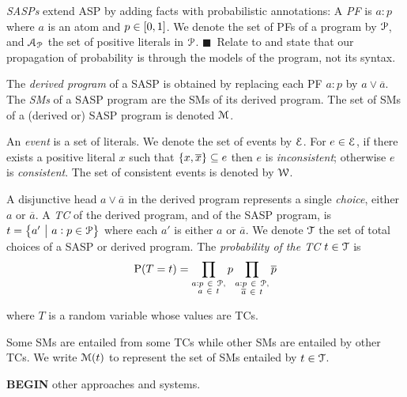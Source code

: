 \documentclass{article}
\newcommand{\at}[1]{\ensuremath{\!\del{#1}}}
\newcommand{\co}[1]{\ensuremath{\overline{#1}}}
\newcommand{\cla}[1]{\ensuremath{{\cal #1}}}
\newcommand{\prfunc}{\ensuremath{\mathrm{P}}}
\newcommand{\pr}[1]{\ensuremath{\prfunc\at{#1}}}
\newcommand{\given}{\ensuremath{~\middle|~}}
\newcommand{\probfact}[2]{\ensuremath{#1:#2}}%
\newcommand{\tcgen}[1]{\MODELset\at{#1}}
\newcommand{\ATOMSset}{\ensuremath{\cla{A}}}
\newcommand{\PATOMset}{\ensuremath{\ATOMSset_{\cla{P}}}}
\newcommand{\PROBFset}{\ensuremath{\cla{P}}}
\newcommand{\TCHOICEset}{\ensuremath{\cla{T}}}
\newcommand{\MODELset}{\ensuremath{\cla{M}}}
\newcommand{\EVENTSset}{\ensuremath{\cla{E}}}
\newcommand{\CONSISTset}{\ensuremath{\cla{W}}}
\newcommand{\disj}{\ensuremath{\vee}}
\newcommand{\LOOK}{\ensuremath{\blacksquare}}
\newcommand{\franc}[1]{{\color{green!30!black}#1}}
\begin{document}
\emph{\Acfp{SASP}} extend \ac{ASP} by adding facts with probabilistic
annotations: A \textit{\ac{PF}} is $\probfact{a}{p}$ where $a$ is an
atom and $p\in\intcc{0,1}$.  We denote the set of \aclp{PF} of a
program by $\PROBFset$, and $\PATOMset$ the set of positive literals
in $\PROBFset$. \franc{\LOOK~Relate to \cite{kifer1992theory} and state that our propagation of probability is through the models of the program, not its syntax.}

%
The \emph{derived program} of a \ac{SASP} is obtained by replacing
each \acl{PF} $\probfact{a}{p}$ by $a \disj \co{a}$.  The \textit{\aclp{SM}} of a
\acs{SASP} program are the \aclp{SM} of its derived program. The set
of \acp{SM} of a (derived or) \acs{SASP} program is denoted
$\MODELset$.

An \emph{event} is a set of literals.  We denote the set of events by
$\EVENTSset$.  For $e \in \EVENTSset$, if there exists a positive
literal $x$ such that $\set{x, \co{x}} \subseteq e$ then $e$ is
\textit{inconsistent}; otherwise $e$ is \textit{consistent}.  The set
of consistent events is denoted by $\CONSISTset$.

A disjunctive head $a \disj \co{a}$ in the derived program represents
a single \textit{choice}, either $a$ or $\co{a}$.  A \textit{\acl{TC}}
of the derived program, and of the SASP program, is
$t = \set{a' \given \probfact{a}{p} \in \PROBFset}$ where each $a'$ is
either $a$ or $\co{a}$.  We denote $\TCHOICEset$ the set of total
choices of a \ac{SASP} or derived program.  The \emph{probability of
  the \acl{TC} $t \in \TCHOICEset$} is
\begin{equation}
	\pr{T = t} = 
	\prod_{\substack{
		\probfact{a}{p}~ \in ~\PROBFset,\\
		a~ \in~ t}} p 
	\prod_{\substack{
		\probfact{a}{p}~ \in ~\PROBFset,\\
		\co{a}~\in~ t}} \co{p}
	\label{eq:prob.total.choice}
\end{equation}

where $T$ is a random variable whose values are \aclp{TC}.

Some \aclp{SM} are entailed from some \aclp{TC} while other \acp{SM}
are entailed by other \acp{TC}.  We write $\tcgen{t}$ to represent the
set of \acp{SM} entailed by $t \in \TCHOICEset$.
%

\franc{\textbf{BEGIN} other approaches and systems.}
\end{document}

